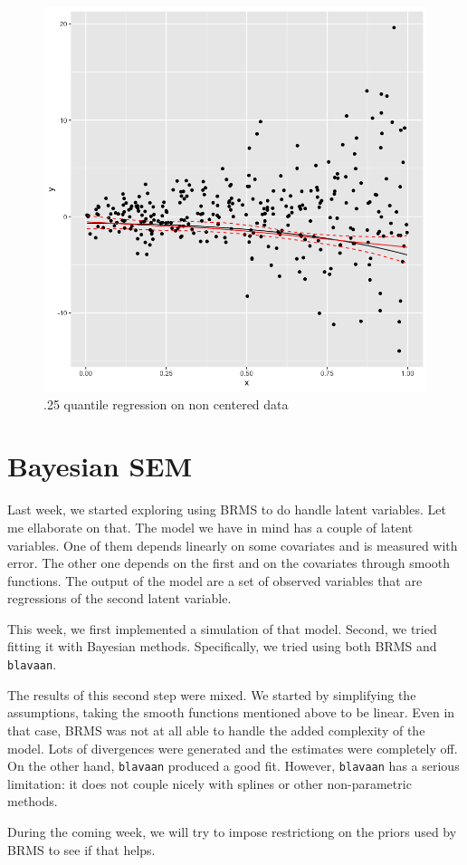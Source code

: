 \documentclass{article}
\begin{document}
\begin{figure}[ht]
    \centering
    \includegraphics[width=.8\textwidth]{output2.png}
    \caption{.25 quantile regression on non centered data}
    \label{fig:output2}
\end{figure}

\section{Bayesian SEM}

Last week, we started exploring using BRMS to do handle latent variables. 
Let me ellaborate on that. 
The model we have in mind has a couple of latent variables.
One of them depends linearly on some covariates and is measured with error. 
The other one depends on the first and on the covariates through smooth functions. 
The output of the model are a set of observed variables that are regressions of the second latent variable. 

This week, we first implemented a simulation of that model. 
Second, we tried fitting it with Bayesian methods. 
Specifically, we tried using both BRMS and \lstinline{blavaan}. 

The results of this second step were mixed. 
We started by simplifying the assumptions, taking the smooth functions mentioned above to be linear.
Even in that case, BRMS was not at all able to handle the added complexity of the model. 
Lots of divergences were generated and the estimates were completely off.
On the other hand, \lstinline{blavaan} produced a good fit.
However, \lstinline{blavaan} has a serious limitation: 
it does not couple nicely with splines or other non-parametric methods. 

During the coming week, we will try to impose restrictiong on the priors used by BRMS to see if that helps.
\end{document}
